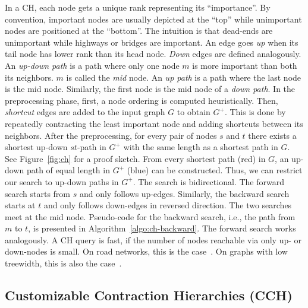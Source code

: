 \documentclass[manuscript,review]{acmart}
\begin{document}
In a CH, each node gets a unique rank representing its ``importance''.
By convention, important nodes are usually depicted at the ``top'' while unimportant nodes are positioned at the ``bottom''.
The intuition is that dead-ends are unimportant while highways or bridges are important.
An edge goes \emph{up} when its tail node has lower rank than its head node.
\emph{Down} edges are defined analogously.
An \emph{up-down path} is a path where only one node $m$ is more important than both its neighbors.
$m$ is called the \emph{mid} node.
An \emph{up path} is a path where the last node is the mid node.
Similarly, the first node is the mid node of a \emph{down path}.
%
In the preprocessing phase, first, a node ordering is computed heuristically.
Then, \emph{shortcut} edges are added to the input graph $G$ to obtain $G^+$.
This is done by repeatedly contracting the least important node and adding shortcuts between its neighbors.
After the preprocessing, for every pair of nodes $s$ and $t$ there exists a shortest up-down $st$-path in $G^+$ with the same length as a shortest path in $G$.
See Figure~\ref{fig:ch} for a proof sketch.
From every shortest path (red) in $G$, an up-down path of equal length in $G^+$ (blue) can be constructed.
Thus, we can restrict our search to up-down paths in $G^+$.
The search is bidirectional.
The forward search starts from $s$ and only follows up-edges.
Similarly, the backward search starts at $t$ and only follows down-edges in reversed direction.
The two searches meet at the mid node.
Pseudo-code for the backward search, i.e., the path from $m$ to $t$, is presented in Algorithm~\ref{algo:ch-backward}.
The forward search works analogously.
%
A CH query is fast, if the number of nodes reachable via only up- or down-nodes is small.
On road networks, this is the case~\cite{gssv-erlrn-12,dgpw-crprn-13}.
On graphs with low treewidth, this is also the case~\cite{dsw-cch-15,hs-gbpo-18}.


\subsection{Customizable Contraction Hierarchies (CCH)}
\label{sec:cch-intro}
\end{document}
